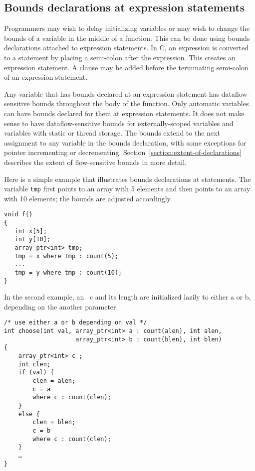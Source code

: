 \subsection{Bounds declarations at expression statements}
\label{section:statement-declarations}

Programmers may wish to delay initializing variables or may wish to
change the bounds of a variable in the middle of a function. This can be
done using bounds declarations attached to expression statements. In C,
an expression is converted to a statement by placing a semi-colon after
the expression. This creates an expression statement. A 
clause may be added before the terminating semi-colon of an expression
statement.

Any variable that has bounds declared at an expression statement has
dataflow-sensitive bounds throughout the body of the function. Only
automatic variables can have bounds declared for them at expression
statements. It does not make sense to have dataflow-sensitive bounds for
externally-scoped variables and variables with static or thread storage.
The bounds extend to the next assignment to any variable in the bounds
declaration, with some exceptions for pointer incrementing or
decrementing. Section~\ref{section:extent-of-declarations} 
describes the extent of flow-sensitive bounds
in more detail.

Here is a simple example that illustrates bounds declarations at
statements. The variable \texttt{tmp} first points to an array with 5
elements and then points to an array with 10 elements; the bounds are
adjusted accordingly.

\begin{verbatim}
void f() 
{
   int x[5];
   int y[10];
   array_ptr<int> tmp;
   tmp = x where tmp : count(5);
   ...
   tmp = y where tmp : count(10);
}
\end{verbatim}

In the second example, an \arrayptr\ c and its length are initialized
lazily to either a or b, depending on the another parameter.

\begin{verbatim}
/* use either a or b depending on val */
int choose(int val, array_ptr<int> a : count(alen), int alen,
                    array_ptr<int> b : count(blen), int blen) 
{
    array_ptr<int> c ;
    int clen;
    if (val) {
        clen = alen;
        c = a
        where c : count(clen);
    }
    else {
        clen = blen;
        c = b
        where c : count(clen);
    }    
    … 
}
\end{verbatim}

